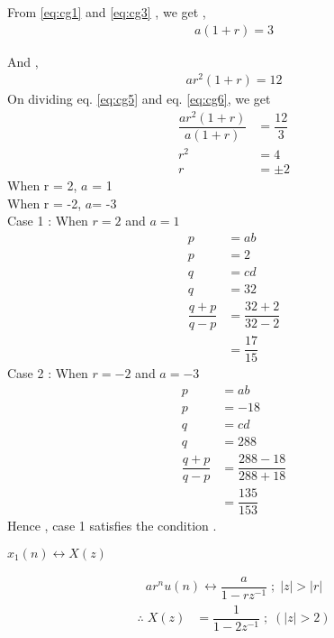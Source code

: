 \documentclass[journal,12pt,twocolumn]{IEEEtran}
\theoremstyle{remark}
\begin{document}
From \ref{eq:cg1} and \ref{eq:cg3} , we get , 
\begin{align}
a(1+r)=3 \label{eq:cg5}
\end{align}
 
 And ,
 \begin{align}
ar^{2}(1+r) = 12 \label{eq:cg6}
\end{align}
On dividing eq. \ref{eq:cg5} and eq. \ref{eq:cg6}, we get
\begin{align}
\dfrac{ar^{2}(1+r)}{a(1+r)} &= \dfrac{12}{3} \\
r^{2} &= 4 \\
r &= \pm2
\end{align}
When r = 2, $a$ = 1 \\
When r = -2, $a$= -3 \\
Case 1 :
When $r = 2$ and $a = 1$ \\
\begin{align}
p &= ab\\
p&=2 \\
q&= cd \\
q&=32 \\
\dfrac{q+p}{q-p} &= \dfrac{32 + 2}{32 - 2} \\
&=\dfrac{17}{15}
\end{align}
Case 2 :
When $r = -2$ and $a = -3$ \\
\begin{align}
p &= ab\\
p&=-18 \\
q&= cd \\
q&=288 \\
\dfrac{q+p}{q-p} &= \dfrac{288-18}{288+18} \\
&=\dfrac{135}{153}
\end{align}
Hence , case 1 satisfies the condition .
\begin{center}
 $x_1(n) \longleftrightarrow X(z)$
\end{center}
 \begin{align}
ar^{n}u(n)  \longleftrightarrow  \dfrac{a}{1 - rz^{-1}} \; ; \; |z| > |r| 
 \end{align}
  \begin{align}
\therefore \; X(z) &= \dfrac{1}{1 - 2z^{-1}} \; ; \;( |z| > 2 )
 \end{align}
\end{document}
